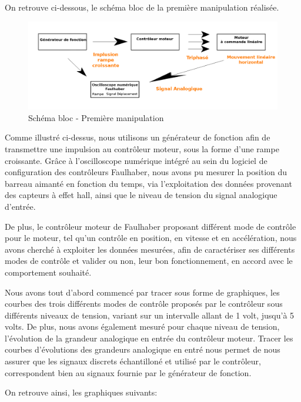 \documentclass[french,a4paper,12pt]{report}
\begin{document}
	On retrouve ci-dessous, le schéma bloc de la première manipulation réalisée.
		
	\begin{figure}[!ht]
    \center
  	\includegraphics[width=18cm]{manip1.png}
    \caption{Schéma bloc - Première manipulation}
	\end{figure}	
		
		Comme illustré ci-dessus, nous utilisons un générateur de fonction afin de transmettre une impulsion au contrôleur moteur, sous la forme d'une rampe croissante.
		Grâce à l'oscilloscope numérique intégré au sein du logiciel de configuration des contrôleurs Faulhaber, nous avons pu mesurer la position du barreau aimanté en fonction du temps, via l'exploitation des données provenant des capteurs à effet hall, ainsi que le niveau de tension du signal analogique d'entrée.
		
		De plus, le contrôleur moteur de Faulhaber proposant différent mode de contrôle pour le moteur, tel qu'un contrôle en position, en vitesse et en accélération, nous avons cherché à exploiter les données mesurées, afin de caractériser ses différents modes de contrôle et valider ou non, leur bon fonctionnement, en accord avec le comportement souhaité.
		
		Nous avons tout d'abord commencé par tracer sous forme de graphiques, les courbes des trois différents modes de contrôle proposés par le contrôleur sous différents niveaux de tension, variant sur un intervalle allant de 1 volt, jusqu'à 5 volts.
		De plus, nous avons également mesuré pour chaque niveau de tension, l'évolution de la grandeur analogique en entrée du contrôleur moteur. Tracer les courbes d'évolutions des grandeurs analogique en entré nous permet de nous assurer que les signaux discrets échantilloné et utilisé par le contrôleur, correspondent bien au signaux fournie par le générateur de fonction.
		
		On retrouve ainsi, les graphiques suivants:
		
\end{document}
